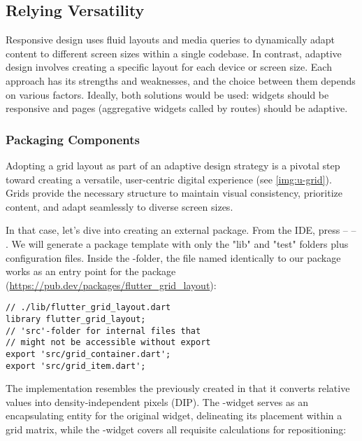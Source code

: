 
\newpage
\subsection{Relying Versatility}

Responsive design uses fluid layouts and media queries to dynamically adapt content to different screen sizes within a 
single codebase. In contrast, adaptive design involves creating a specific layout for each device or screen size. Each 
approach has its strengths and weaknesses, and the choice between them depends on various factors. Ideally, both 
solutions would be used: widgets should be responsive and pages (aggregative widgets called by routes) should be 
adaptive.


\subsubsection{Packaging Components}

Adopting a grid layout as part of an adaptive design strategy is a pivotal step toward creating a versatile, 
user-centric digital experience (see \cref{img:u-grid}). Grids provide the necessary structure to maintain visual 
consistency, prioritize content, and adapt seamlessly to diverse screen sizes.

In that case, let's dive into creating an external package. From the IDE, press  --  -- 
. We will generate a package template with only the "lib" and "test" folders plus configuration files. Inside 
the -folder, the file named identically to our package works as an entry point for the package 
(\href{https://pub.dev/packages/flutter_grid_layout}{https://pub.dev/packages/flutter\_grid\_layout}):

\begin{lstlisting}
// ./lib/flutter_grid_layout.dart
library flutter_grid_layout;
// 'src'-folder for internal files that 
// might not be accessible without export
export 'src/grid_container.dart';
export 'src/grid_item.dart';
\end{lstlisting}


\noindent The implementation resembles the previously created  in that it converts relative values into 
density-independent pixels (DIP). The -widget serves as an encapsulating entity for the original widget, 
delineating its placement within a grid matrix, while the -widget covers all requisite calculations for 
repositioning:

